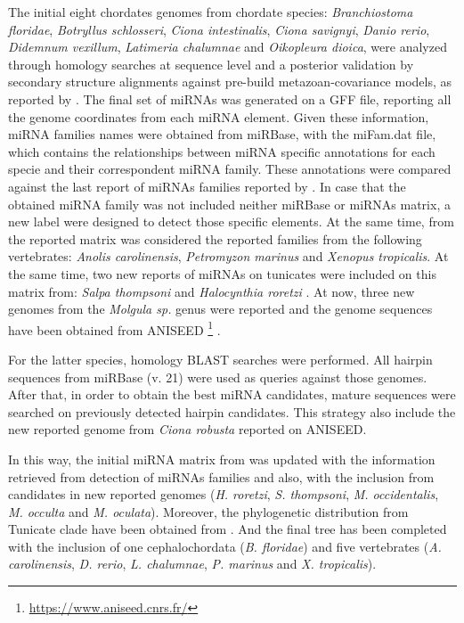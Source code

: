\documentclass[11pt]{article}
\begin{document}
The initial eight chordates genomes from chordate species: 
\textit{Branchiostoma floridae}, \textit{Botryllus schlosseri}, 
\textit{Ciona intestinalis}, \textit{Ciona savignyi}, \textit{Danio rerio}, 
\textit{Didemnum vexillum}, \textit{Latimeria chalumnae} and 
\textit{Oikopleura dioica}, were analyzed through homology searches at sequence 
level and a posterior validation by secondary structure alignments against 
pre-build metazoan-covariance models, as reported by \cite{velandia:2016}. The 
final set of miRNAs was generated on a GFF file, reporting all the genome 
coordinates from each miRNA element. Given these information, miRNA families 
names were obtained from miRBase, with the miFam.dat file, which contains the 
relationships between miRNA specific annotations for each specie and their 
correspondent miRNA family. These annotations were compared against the last 
report of miRNAs families reported by \cite{Hertel2015}. In case that the 
obtained miRNA family was not included neither miRBase or miRNAs matrix, a new 
label were designed to detect those specific elements. At the same time, from 
the reported matrix was considered the reported families from the following 
vertebrates: \textit{Anolis carolinensis}, \textit{Petromyzon marinus} and 
\textit{Xenopus tropicalis}. At the same time, two new reports of miRNAs on 
tunicates were included on this matrix from: \textit{Salpa thompsoni} 
\cite{Jue2016} and \textit{Halocynthia roretzi} \cite{Wang2017}. At now, three 
new genomes from the \textit{Molgula sp.} genus were reported \cite{Stolfi2014} 
and the genome sequences have been obtained from ANISEED 
\footnote{\url{https://www.aniseed.cnrs.fr/}} \cite{Brozovic2017}.

For the latter species, homology BLAST searches were performed. All hairpin 
sequences from miRBase (v. 21) \cite{Kozomara2014} were used as queries against 
those genomes. After that, in order to obtain the best miRNA 
candidates, mature sequences were searched on previously detected hairpin 
candidates. This strategy also include the new reported genome from 
\textit{Ciona robusta} reported on ANISEED. 

In this way, the initial miRNA matrix from \cite{Hertel2015} was updated 
with the information retrieved from detection of miRNAs families and also, with 
the inclusion from candidates in new reported genomes (\textit{H. roretzi}, 
\textit{S. thompsoni}, \textit{M. occidentalis}, \textit{M. occulta} and 
\textit{M. oculata}). Moreover, the phylogenetic distribution from Tunicate 
clade have been obtained from \cite{Simion2016}. And the final tree has been 
completed with the inclusion of one cephalochordata (\textit{B. floridae}) and 
five vertebrates (\textit{A. carolinensis}, \textit{D. rerio}, \textit{L. 
chalumnae}, \textit{P. marinus} and \textit{X. tropicalis}).
\end{document}
